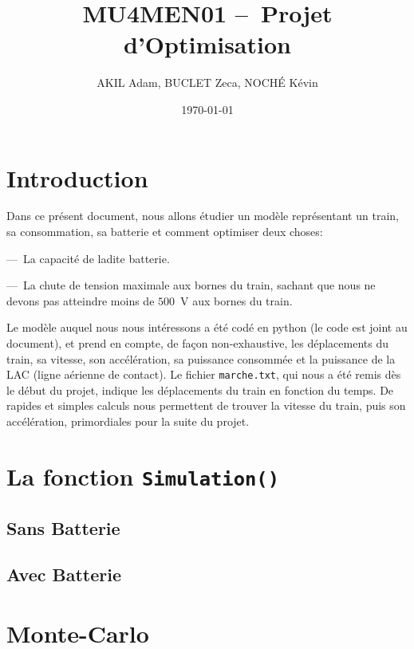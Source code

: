 \documentclass[11pt, a4paper, oneside, portrait]{report}
\title{\textbf{MU4MEN01 --~Projet d'Optimisation}}
\author{AKIL Adam, BUCLET Zeca, NOCHÉ Kévin} %
\date{\today}
\begin{document}
    \maketitle\thispagestyle{empty} %
    \newpage\tableofcontents\thispagestyle{empty}

    \newpage\setcounter{page}{1} %


    \section*{Introduction}
        Dans ce présent document, nous allons étudier un modèle représentant un train, sa consommation, sa batterie et comment optimiser deux choses:

        ---~La capacité de ladite batterie.

        ---~La chute de tension maximale aux bornes du train, sachant que nous ne devons pas atteindre moins de $500$~V aux bornes du train.

        Le modèle auquel nous nous intéressons a été codé en python (le code est joint au document), et prend en compte, de façon non-exhaustive, les déplacements du train, sa vitesse, son accélération, sa puissance consommée et la puissance de la LAC (ligne aérienne de contact).
        Le fichier \texttt{marche.txt}, qui nous a été remis dès le début du projet, indique les déplacements du train en fonction du temps.
        De rapides et simples calculs nous permettent de trouver la vitesse du train, puis son accélération, primordiales pour la suite du projet.

    \section*{La fonction \texttt{Simulation()}}
        \subsection*{Sans Batterie}
        \subsection*{Avec Batterie}


    \section*{Monte-Carlo}
\end{document}
